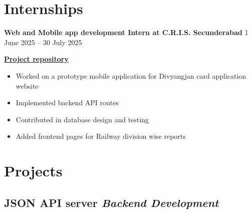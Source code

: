 \documentclass{article}
\begin{document}

\section*{Internships}

\noindent\large\textbf{Web and Mobile app development Intern at C.R.I.S. Secunderabad} \hfill 1 June 2025 -- 30 July 2025

\vspace{2pt}
\noindent{} \hfill \href{https://gitlab.com/rishabhsahu325/cris_sec25_divjan}{\textbf{Project repository}}

\begin{itemize}[leftmargin=15pt, topsep=0pt, itemsep=2pt]
	\item {\fontsize{11.5pt}{13.5pt}\selectfont Worked on a prototype mobile application for Divyangjan card application website}
	\item {\fontsize{11.5pt}{13.5pt}\selectfont Implemented backend API routes}
	\item {\fontsize{11.5pt}{13.5pt}\selectfont Contributed in database design and testing}
	\item {\fontsize{11.5pt}{13.5pt}\selectfont Added frontend pages for Railway division wise reports}
\end{itemize}



\section*{Projects}

\subsection*{JSON API server \hfill {\normalfont\itshape\small Backend Development}}

\vspace{2pt}
\noindent{}
\end{document}
